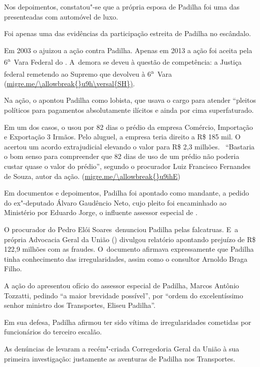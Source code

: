 Nos depoimentos, constatou"-se que a própria esposa de Padilha foi uma
das presenteadas com automóvel de luxo.

Foi apenas uma das evidências da participação estreita de Padilha no
escândalo.

Em 2003 o  ajuizou a ação contra Padilha. Apenas em 2013 a ação foi
aceita pela 6\textsuperscript{a}~Vara Federal do . A~demora se deveu à
questão de competência: a Justiça federal remetendo ao Supremo que
devolveu à 6\textsuperscript{a}~Vara (\url{migre.me/\allowbreak{}u9h\versal{SH})}.

Na ação, o  apontou Padilha como lobista, que usava o cargo para
atender ``pleitos políticos para pagamentos absolutamente ilícitos e
ainda por cima superfaturado.

Em um dos casos, o  usou por 82 dias o prédio da empresa Comércio,
Importação e Exportação 3 Irmãos. Pelo aluguel, a empresa teria direito
a R\$ 185 mil. O~ acertou um acordo extrajudicial elevando o valor
para R\$ 2,3 milhões. ~``Bastaria o bom senso para compreender que 82
dias de uso de um prédio \redondo{[…]} não poderia custar quase o valor
do prédio'', segundo o procurador Luiz Francisco Fernandes de Souza,
autor da ação. (\url{migre.me/\allowbreak{}u9ihE})

Em documentos e depoimentos, Padilha foi apontado como mandante, a
pedido do ex"-deputado Álvaro Gaudêncio Neto, cujo pleito foi encaminhado
ao Ministério por Eduardo Jorge, o influente assessor especial de .

O procurador do  Pedro Elói Soares~denunciou Padilha pelas
falcatruas. E~a própria Advocacia Geral da União () divulgou
relatório apontando prejuízo de R\$ 122,9 milhões com as fraudes. O~documento afirmava expressamente que Padilha tinha conhecimento das
irregularidades, assim como o consultor Arnoldo Braga Filho.

A ação do  apresentou ofício do assessor especial de Padilha, Marcos
Antônio Tozzatti, pedindo ``a maior brevidade possível'', por ``ordem do
excelentíssimo senhor ministro dos Transportes, Eliseu Padilha''.

Em sua defesa, Padilha afirmou ter sido vítima de irregularidades
cometidas por funcionários do terceiro escalão.

As denúncias de  levaram a recém"-criada Corregedoria Geral da União à
sua primeira investigação: justamente as aventuras de Padilha nos
Transportes.

